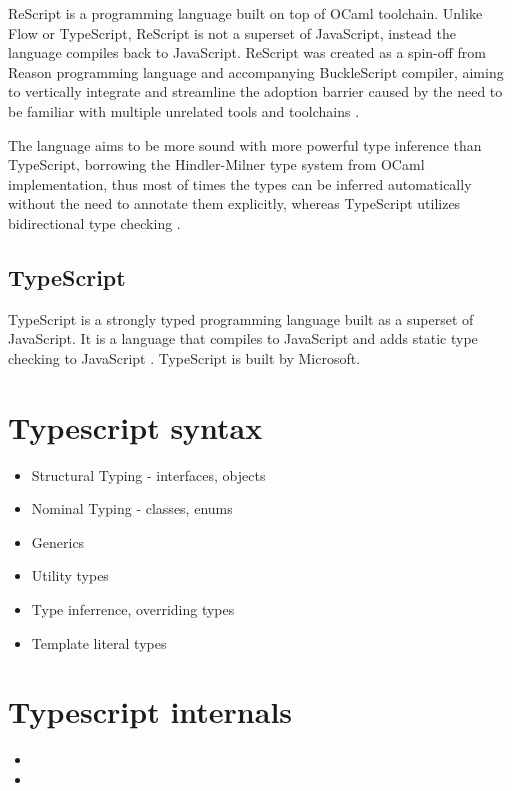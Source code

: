 ReScript is a programming language built on top of OCaml toolchain. Unlike Flow or TypeScript, ReScript is not a superset of JavaScript, instead the language compiles back to JavaScript. ReScript was created as a spin-off from Reason programming language and accompanying BuckleScript compiler, aiming to vertically integrate and streamline the adoption barrier caused by the need to be familiar with multiple unrelated tools and toolchains \cite{BuckleScriptReasonRebranding}.  

The language aims to be more sound with more powerful type inference than TypeScript, borrowing the Hindler-Milner type system from OCaml implementation, thus most of times the types can be inferred automatically without the need to annotate them explicitly, whereas TypeScript utilizes bidirectional type checking \cite{ReconstructingTypeScriptPart}. 

\subsection{TypeScript}

TypeScript is a strongly typed programming language built as a superset of JavaScript. It is a language that compiles to JavaScript and adds static type checking to JavaScript \cite{DocumentationTypeScriptJavaScript}. TypeScript is built by Microsoft. 

\section{Typescript syntax}

\begin{itemize}
  \item Structural Typing - interfaces, objects
  \item Nominal Typing - classes, enums
  \item Generics
  \item Utility types
  \item Type inferrence, overriding types
  \item Template literal types
\end{itemize}

\section{Typescript internals}

\begin{itemize}
  \item
  \item
\end{itemize}

